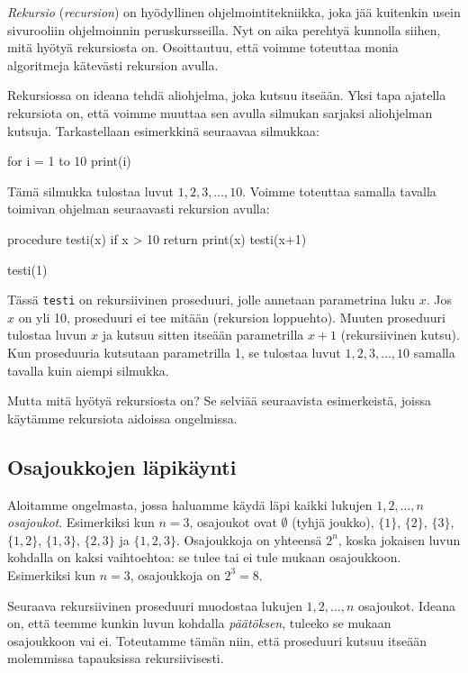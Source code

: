 
\emph{Rekursio} (\emph{recursion}) on hyödyllinen ohjelmointitekniikka,
joka jää kuitenkin usein sivurooliin ohjelmoinnin peruskursseilla.
Nyt on aika perehtyä kunnolla siihen,
mitä hyötyä rekursiosta on.
Osoittautuu, että voimme toteuttaa monia algoritmeja
kätevästi rekursion avulla.

Rekursiossa on ideana tehdä aliohjelma, joka kutsuu itseään.
Yksi tapa ajatella rekursiota on, että voimme muuttaa sen avulla
silmukan sarjaksi aliohjelman kutsuja.
Tarkastellaan esimerkkinä seuraavaa silmukkaa:

\begin{code}
for i = 1 to 10
    print(i)
\end{code}

Tämä silmukka tulostaa luvut $1,2,3,\dots,10$.
Voimme toteuttaa samalla tavalla toimivan ohjelman
seuraavasti rekursion avulla:

\begin{code}
procedure testi(x)
    if x > 10
        return
    print(x)
    testi(x+1)
    
testi(1)
\end{code}

Tässä \texttt{testi} on rekursiivinen proseduuri,
jolle annetaan parametrina luku $x$.
Jos $x$ on yli 10, proseduuri ei tee mitään (rekursion loppuehto).
Muuten proseduuri tulostaa luvun $x$ ja kutsuu sitten
itseään parametrilla $x+1$ (rekursiivinen kutsu).
Kun proseduuria kutsutaan parametrilla 1,
se tulostaa luvut $1,2,3,\dots,10$ samalla tavalla kuin aiempi silmukka.

Mutta mitä hyötyä rekursiosta on?
Se selviää seuraavista esimerkeistä,
joissa käytämme rekursiota aidoissa ongelmissa.

\subsection{Osajoukkojen läpikäynti}


Aloitamme ongelmasta, jossa haluamme käydä läpi
kaikki lukujen $1,2,\dots,n$ \emph{osajoukot}.
Esimerkiksi kun $n=3$, osajoukot ovat
$\emptyset$ (tyhjä joukko), $\{1\}$, $\{2\}$, $\{3\}$,
$\{1,2\}$, $\{1,3\}$, $\{2,3\}$ ja $\{1,2,3\}$.
Osajoukkoja on yhteensä $2^n$,
koska jokaisen luvun kohdalla on kaksi vaihtoehtoa:
se tulee tai ei tule mukaan osajoukkoon.
Esimerkiksi kun $n=3$, osajoukkoja on $2^3=8$.

Seuraava rekursiivinen proseduuri muodostaa lukujen
$1,2,\dots,n$ osajoukot.
Ideana on, että teemme kunkin luvun
kohdalla \emph{päätöksen}, tuleeko se mukaan osajoukkoon vai ei.
Toteutamme tämän niin,
että proseduuri kutsuu itseään molemmissa tapauksissa rekursiivisesti.

